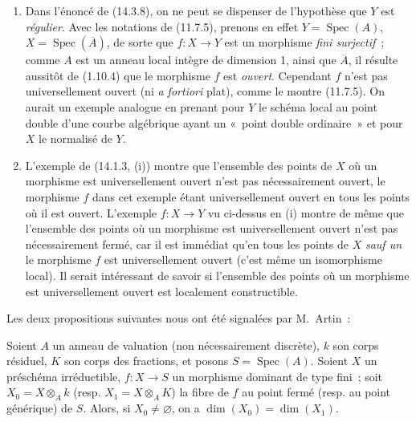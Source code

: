 \begin{remarks}[14.3.9]
\label{IV.14.3.9-fr}
\begin{enumerate}[label=(\roman*)]
  \item Dans l'énoncé de (14.3.8), on ne peut se dispenser de l'hypothèse que $Y$
  est \emph{régulier}. Avec les notations de (11.7.5), prenons en effet
  $Y=\operatorname{Spec}(A)$, $X=\operatorname{Spec}(\overline A)$, de sorte que
  $f:X\to Y$ est un morphisme \emph{fini surjectif}~; comme $A$ est un anneau
  local intègre de dimension 1, ainsi que $\overline A$, il résulte aussitôt de
  (1.10.4) que le morphisme $f$ est \emph{ouvert}. Cependant $f$ n'est pas
  universellement ouvert (ni \emph{a fortiori} plat), comme le montre (11.7.5).
  On aurait un exemple analogue en prenant pour $Y$ le schéma local au point
  double d'une courbe algébrique ayant un «~point double ordinaire~» et pour $X$
  le normalisé de $Y$.

  \item L'exemple de (14.1.3, (i)) montre que l'ensemble des points de $X$ où un
  morphisme est universellement ouvert n'est pas nécessairement ouvert, le
  morphisme $f$ dans cet exemple étant universellement ouvert en tous les points
  où il est ouvert. L'exemple $f:X\to Y$ vu ci-dessus en (i) montre de même que
  l'ensemble des points où un morphisme est universellement ouvert n'est pas
  nécessairement fermé, car il est immédiat qu'en tous les points de $X$ \emph{sauf un}
  le morphisme $f$ est universellement ouvert (c'est même un isomorphisme local).
  Il serait intéressant de savoir si l'ensemble des points où un morphisme est
  universellement ouvert est localement constructible.
\end{enumerate}
\end{remarks}

Les deux propositions suivantes nous ont été signalées par M.~Artin~:

\begin{lemma}[14.3.10]
\label{IV.14.3.10-fr}
Soient $A$ un anneau de valuation (non nécessairement discrète), $k$ son corps
résiduel, $K$ son corps des fractions, et posons $S=\operatorname{Spec}(A)$. Soient
$X$ un préschéma irréductible, $f:X\to S$ un morphisme dominant de type fini~; soit
$X_0=X\otimes_A k$ \textup{(resp.} $X_1=X\otimes_A K$\textup{)} la fibre de $f$ au point fermé
\textup{(resp.} au point générique\textup{)} de $S$. Alors, si $X_0\ne\varnothing$, on a
$\dim(X_0)=\dim(X_1)$.
\end{lemma}

